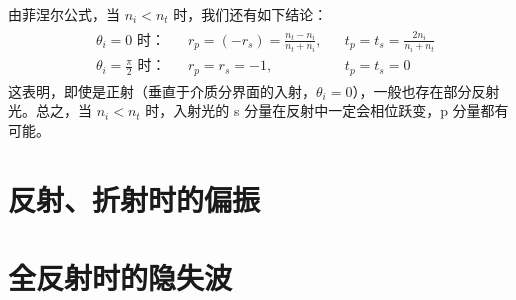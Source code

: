 \documentclass[UTF8]{report}
\theoremstyle{MyLineTheoremStyle} %
\theoremstyle{MyBlockTheoremStyle} %
\theoremstyle{MySubsubsectionStyle} %
\begin{document}
由菲涅尔公式，当 $n_i < n_t$ 时，我们还有如下结论：
\begin{gather}
    \begin{aligned}
        &\text{$\theta_i = 0$ 时：} &&r_p = (-r_s)  = \frac{n_t - n_i}{n_t + n_i}, &&t_p = t_s = \frac{2n_i}{n_i + n_t} \\ 
        &\text{$\theta_i = \frac{\pi}{2}$ 时：} &&r_p = r_s  = -1,&&t_p = t_s  =0
    \end{aligned}
\end{gather}
这表明，即使是正射（垂直于介质分界面的入射，$\theta_i = 0$），一般也存在部分反射光。总之，当 $n_i < n_t$ 时，入射光的 s 分量在反射中一定会相位跃变，p 分量都有可能。



\section{反射、折射时的偏振}










\section{全反射时的隐失波}
\end{document}
